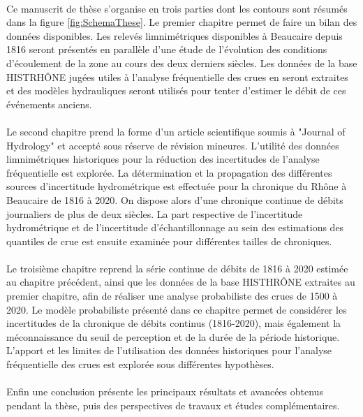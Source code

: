 	\paragraph{} Ce manuscrit de thèse s'organise en trois parties dont les contours sont résumés dans la figure \ref{fig:SchemaThese}. Le premier chapitre permet de faire un bilan des données disponibles. Les relevés limnimétriques disponibles à Beaucaire depuis 1816  seront présentés en parallèle d'une étude de l'évolution des conditions d'écoulement de la zone au cours des deux derniers siècles. Les données de la base HISTRHÔNE jugées utiles à l'analyse fréquentielle des crues en seront extraites et des modèles hydrauliques seront utilisés pour tenter d'estimer le débit de ces événements anciens. 
	
	\paragraph{} Le second chapitre prend la forme d'un article scientifique soumis à "Journal of Hydrology" et accepté sous réserve de révision mineures. L'utilité des données limnimétriques historiques pour la réduction des incertitudes de l'analyse fréquentielle est explorée. La détermination et la propagation des différentes sources d'incertitude hydrométrique est effectuée pour la chronique du Rhône à Beaucaire de 1816 à 2020. On dispose alors d'une chronique continue de débits journaliers de plus de deux siècles. La part respective de l'incertitude hydrométrique et de l'incertitude d'échantillonnage au sein des estimations des quantiles de crue est ensuite examinée pour différentes tailles de chroniques. 
	
	\paragraph{} Le troisième chapitre reprend la série continue de débits de 1816 à 2020 estimée au chapitre précédent, ainsi que les données de la base HISTHRÔNE extraites au premier chapitre, afin de réaliser une analyse probabiliste des crues de 1500 à 2020. Le modèle probabiliste présenté dans ce chapitre permet de considérer les incertitudes de la chronique de débits continus (1816-2020), mais également la méconnaissance du seuil de perception et de la durée de la période historique. L'apport et les limites de l'utilisation des données historiques pour l'analyse fréquentielle des crues est explorée sous différentes hypothèses. 
	
	\paragraph{} Enfin une conclusion présente les principaux résultats et avancées obtenus pendant la thèse, puis des perspectives de travaux et études complémentaires.
	

